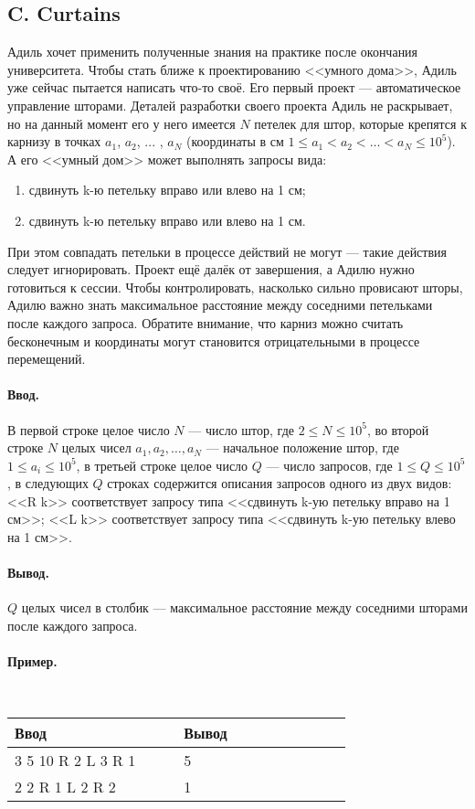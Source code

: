 \documentclass[12pt, a4paper]{article}
\newcommand{\informat}[1]
{
	\paragraph{Ввод.\\} #1
}
\newcommand{\outformat}[1]
{
	\paragraph{Вывод.\\} #1
}
\newcommand{\examplee}[4]
{
	\paragraph{Пример.\\}
	{\tt
	\begin{tabular}{|p{0.4\linewidth}|p{0.4\linewidth}|}
	\hline
	Ввод 	& Вывод  	\\
	\hline
	#1 		& #2 		\\
	\hline
	#3		& #4		\\
	\hline
	\end{tabular}
	}
}
\begin{document}
\subsection*{C. Curtains}

Адиль хочет применить полученные знания на практике после окончания университета. Чтобы стать ближе к проектированию <<умного дома>>, Адиль уже сейчас пытается написать что-то своё. Его первый проект --- автоматическое управление шторами. Деталей разработки своего проекта Адиль не раскрывает, но на данный момент его у него имеется $N$ петелек для штор, которые крепятся к карнизу в точках $a_1$, $a_2$, ... , $a_N$ (координаты в см \mbox{$1 \le a_1 < a_2 < \dots < a_N \le 10^5$}). А его <<умный дом>> может выполнять запросы вида:
\begin{enumerate}
\item сдвинуть k-ю петельку вправо или влево на 1 см;
\item сдвинуть k-ю петельку вправо или влево на 1 см.
\end{enumerate}
При этом совпадать петельки в процессе действий не могут --- такие действия следует игнорировать. Проект ещё далёк от завершения, а Адилю нужно готовиться к сессии. Чтобы контролировать, насколько сильно провисают шторы, Адилю важно знать максимальное расстояние между соседними петельками после каждого запроса. Обратите внимание, что карниз можно считать бесконечным и координаты могут становится отрицательными в процессе перемещений.

\informat{В первой строке целое число $N$ --- число штор, где $2 \le N \le 10^5$, \newline
во второй строке $N$ целых чисел $a_1, a_2, \dots, a_N$ --- начальное положение штор, где $1 \le a_i \le 10^5$, \newline
в третьей строке целое число $Q$ --- число запросов, где $1 \le Q \le 10^5$, \newline
в следующих $Q$ строках содержится описания запросов одного из двух видов: \newline
<<R k>> соответствует запросу типа <<сдвинуть k-ую петельку вправо на 1 см>>; \newline
<<L k>> соответствует запросу типа <<сдвинуть k-ую петельку влево на 1 см>>.}

\outformat{$Q$ целых чисел в столбик --- максимальное расстояние между соседними шторами после каждого запроса.}

\examplee{
3 \newline
1 5 10 \newline
3 \newline
R 2 \newline
L 3 \newline
R 1
}
{
5 \newline 5 \newline 4
}
{
2 \newline
1 2 \newline 
3 \newline
R 1 \newline
L 2 \newline
R 2 \newline
}{
1 \newline 1 \newline 2
}
\end{document}
